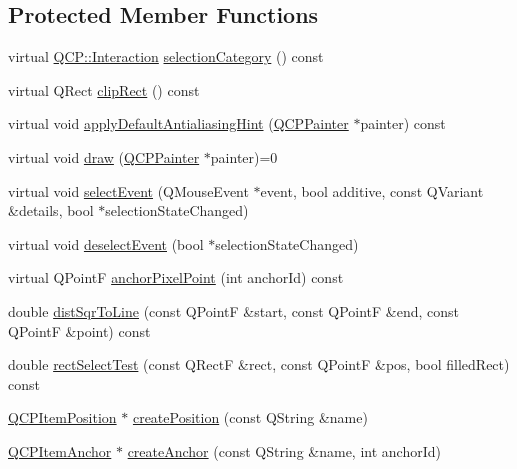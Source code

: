 \subsection*{Protected Member Functions}
\begin{DoxyCompactItemize}
\item 
virtual \hyperlink{namespaceQCP_a2ad6bb6281c7c2d593d4277b44c2b037}{Q\+C\+P\+::\+Interaction} \hyperlink{classQCPAbstractItem_a777b5d384936396ad9c3ceb3d3453f1c}{selection\+Category} () const 
\item 
virtual Q\+Rect \hyperlink{classQCPAbstractItem_a538e25ff8856534582f5b2b400a46405}{clip\+Rect} () const 
\item 
virtual void \hyperlink{classQCPAbstractItem_a0839031abdd71067e2256a4d53c7a011}{apply\+Default\+Antialiasing\+Hint} (\hyperlink{classQCPPainter}{Q\+C\+P\+Painter} $\ast$painter) const 
\item 
virtual void \hyperlink{classQCPAbstractItem_ad0dc056f650c3ca73414e6b4f01674ef}{draw} (\hyperlink{classQCPPainter}{Q\+C\+P\+Painter} $\ast$painter)=0
\item 
virtual void \hyperlink{classQCPAbstractItem_aaf92af7b9893712959a6c073d334d88d}{select\+Event} (Q\+Mouse\+Event $\ast$event, bool additive, const Q\+Variant \&details, bool $\ast$selection\+State\+Changed)
\item 
virtual void \hyperlink{classQCPAbstractItem_a91f090d6763cfedb0749219c63788ae9}{deselect\+Event} (bool $\ast$selection\+State\+Changed)
\item 
virtual Q\+PointF \hyperlink{classQCPAbstractItem_a94bde62b8a2fc133666dcbb8035deeed}{anchor\+Pixel\+Point} (int anchor\+Id) const 
\item 
double \hyperlink{classQCPAbstractItem_acdca343717d625b8abb3c3e38c0ed39d}{dist\+Sqr\+To\+Line} (const Q\+PointF \&start, const Q\+PointF \&end, const Q\+PointF \&point) const 
\item 
double \hyperlink{classQCPAbstractItem_a4c0e14c4e92df91174cb7183fb363069}{rect\+Select\+Test} (const Q\+RectF \&rect, const Q\+PointF \&pos, bool filled\+Rect) const 
\item 
\hyperlink{classQCPItemPosition}{Q\+C\+P\+Item\+Position} $\ast$ \hyperlink{classQCPAbstractItem_a75036d39c4d4e2e1a7dd145fff915d32}{create\+Position} (const Q\+String \&name)
\item 
\hyperlink{classQCPItemAnchor}{Q\+C\+P\+Item\+Anchor} $\ast$ \hyperlink{classQCPAbstractItem_af3fc92527802078ca395138748b629a7}{create\+Anchor} (const Q\+String \&name, int anchor\+Id)
\end{DoxyCompactItemize}
